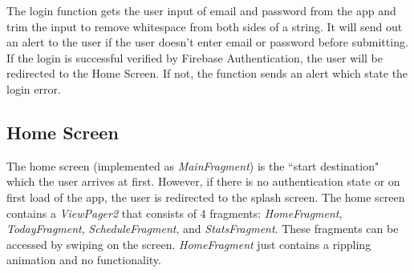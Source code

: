 \documentclass[../report.tex]{subfiles}
\begin{document}
The login function gets the user input of email and password from the app and trim the input to remove whitespace from both sides of a string. It will send out an alert to the user if the user doesn’t enter email or password before submitting. If the login is successful verified by Firebase Authentication, the user will be redirected to the Home Screen. If not, the function sends an alert which state the login error. 



\subsection{Home Screen}
The home screen (implemented as \textit{MainFragment}) is the ``start destination" which the user arrives at first. However, if there is no authentication state or on first load of the app, the user is redirected to the splash screen. The home screen contains a \textit{ViewPager2} that consists of 4 fragments: \textit{HomeFragment}, \textit{TodayFragment}, \textit{ScheduleFragment}, and \textit{StatsFragment}. These fragments can be accessed by swiping on the screen. \textit{HomeFragment} just contains a rippling animation and no functionality. 
\end{document}
